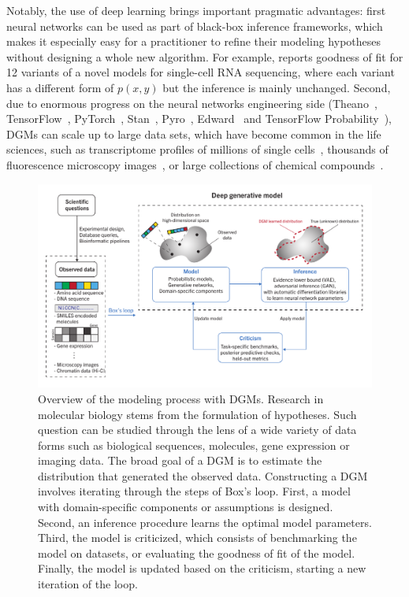Notably, the use of deep learning brings important pragmatic advantages: first neural networks can be used as part of black-box inference frameworks, which makes it especially easy for a practitioner to refine their modeling hypotheses without designing a whole new algorithm. For example, \cite{Gronbech2019} reports goodness of fit for 12 variants of a novel models for single-cell RNA sequencing, where each variant has a different form of $p(x, y)$ but the inference is mainly unchanged. Second, due to enormous progress on the neural networks engineering side (Theano~\cite{TheTheanoDevelopmentTeam2016}, TensorFlow~\cite{Abadi2016}, PyTorch~\cite{paszke2017automatic}, Stan~\cite{Carpenter2017}, Pyro~\cite{Bingham2018}, Edward~\cite{Tran2017} and TensorFlow Probability~\cite{Dillon2017}), DGMs can scale up to large data sets, which have become common in the life sciences, such as transcriptome profiles of millions of single cells~\cite{Angerer2017}, thousands of fluorescence microscopy images~\cite{lafarge2018capturing}, or large collections of chemical compounds~\cite{Sanchez-Lengeling2017, Guimaraes2018}. 


\begin{figure}[t]
    \centering
    \includegraphics[width=\textwidth]{review/figures/overview_fig.pdf}
    \caption[Overview of the modeling process with DGMs.]{Overview of the modeling process with DGMs. Research in molecular biology stems from the formulation of hypotheses. Such question can be studied through the lens of a wide variety of data forms such as biological sequences, molecules, gene expression or imaging data. The broad goal of a DGM is to estimate the distribution that generated the observed data. Constructing a DGM involves iterating through the steps of Box's loop. First, a model with domain-specific components or assumptions is designed. Second, an inference procedure learns the optimal model parameters. Third, the model is criticized, which consists of benchmarking the model on datasets, or evaluating the goodness of fit of the model. Finally, the model is updated based on the criticism, starting a new iteration of the loop.}
    \label{fig:overview}
\end{figure}
